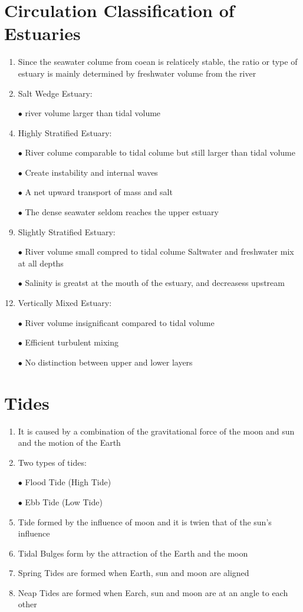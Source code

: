 \documentclass{report}
\begin{document}
\section{Circulation Classification of Estuaries}
\begin{enumerate}
    \item Since the seawater colume from coean is relaticely stable, the ratio or type of estuary is mainly determined by freshwater volume from the river
    \item Salt Wedge Estuary:
    \item [$\bullet$]river volume larger than tidal volume 
    \item Highly Stratified Estuary:
    \item [$\bullet$]River colume comparable to tidal colume but still larger than tidal volume 
    \item [$\bullet$]Create instability and internal waves
    \item [$\bullet$]A net upward transport of mass and salt 
    \item [$\bullet$]The dense seawater seldom reaches the upper estuary 
    \item Slightly Stratified Estuary:
    \item [$\bullet$]River volume small compred to tidal colume
    Saltwater and freshwater mix at all depths 
    \item [$\bullet$]Salinity is greatst at the mouth of the estuary, and decreasess upstream
    \item Vertically Mixed Estuary:
    \item [$\bullet$]River volume insignificant compared to tidal volume 
    \item [$\bullet$]Efficient turbulent mixing 
    \item [$\bullet$]No distinction between upper and lower layers 
\end{enumerate}


\section{Tides}
\begin{enumerate}
    \item It is caused by a combination of the gravitational force of the moon and sun and the motion of the Earth
    \item Two types of tides:
    \item [$\bullet$]Flood Tide (High Tide)
    \item [$\bullet$]Ebb Tide (Low Tide)
    \item Tide formed by the influence of moon and it is twien that of the sun's influence 
    \item Tidal Bulges form by the attraction of the Earth and the moon 
    \item Spring Tides are formed when Earth, sun and moon are aligned
    \item Neap Tides are formed when Earch, sun and moon are at an angle to each other 
\end{enumerate}
\end{document}
